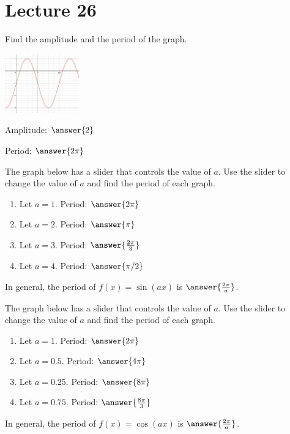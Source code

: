 \documentclass{ximera}
\begin{document}
 
 
 
 
  \section{Lecture 26}
  \begin{problem}\label{prob:160hom11prob2}
  Find the amplitude and the period of the graph.
  \begin{image}
   
\includegraphics[height=1in]{160H11pic2.jpg}~
 
\end{image}
Amplitude: $\answer{2}$

Period: $\answer{2\pi}$
  \end{problem}
  
 \begin{problem}\label{prob:160hom11prob3}  
 The graph below has a slider that controls the value of $a$.  Use the slider to change the value of $a$ and find the period of each graph.
  \begin{center} 
\end{center}
\begin{enumerate}
    \item Let $a=1$.  Period: $\answer{2\pi}$
    \item Let $a=2$.  Period: $\answer{\pi}$
    \item Let $a=3$.  Period: $\answer{\frac{2\pi}{3}}$
    \item Let $a=4$.  Period: $\answer{\pi/2}$
\end{enumerate}
In general, the period of $f(x)=\sin (ax)$ is $\answer{\frac{2\pi}{a}}$.
\end{problem}

\begin{problem}\label{prob:160hom11prob4}  
 The graph below has a slider that controls the value of $a$.  Use the slider to change the value of $a$ and find the period of each graph.
  \begin{center} 
\end{center}
\begin{enumerate}
    \item Let $a=1$.  Period: $\answer{2\pi}$
    \item Let $a=0.5$.  Period: $\answer{4\pi}$
    \item Let $a=0.25$.  Period: $\answer{8\pi}$
    \item Let $a=0.75$.  Period: $\answer{\frac{8\pi}{3}}$
\end{enumerate}
In general, the period of $f(x)=\cos (ax)$ is $\answer{\frac{2\pi}{a}}$.
\end{problem}
\end{document}
